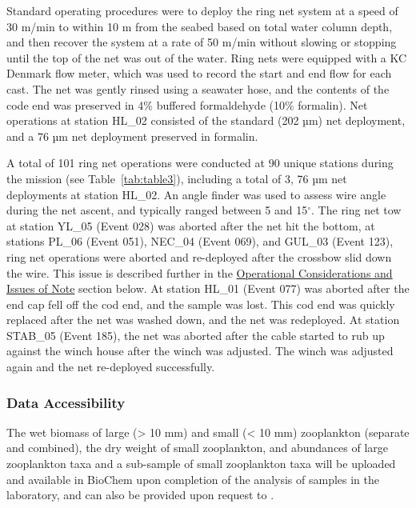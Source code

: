 \documentclass[12pt]{article}\usepackage[]{graphicx}\usepackage[]{color}
\begin{document}
Standard operating procedures were to deploy the ring net system at a speed of 30 m/min to within 10 m from the seabed based on total water column depth, and then recover the system at a rate of 50 m/min without slowing or stopping until the top of the net was out of the water. Ring nets were equipped with a KC Denmark flow meter, which was used to record the start and end flow for each cast. The net was gently rinsed using a seawater hose, and the contents of the code end was preserved in 4\% buffered formaldehyde (10\% formalin). Net operations at station HL\_02 consisted of the standard (202 µm) net deployment, and a 76 µm net deployment preserved in formalin.

A total of 101 ring net operations were conducted at 90 unique stations during the mission (see Table~\ref{tab:table3}), including a total of 3, 76 µm net deployments at station HL\_02. An angle finder was used to assess wire angle during the net ascent, and typically ranged between 5 and 15\(^\circ\). The ring net tow at station YL\_05 (Event 028) was aborted after the net hit the bottom, at stations PL\_06 (Event 051), NEC\_04 (Event 069), and GUL\_03 (Event 123), ring net operations were aborted and re-deployed after the crossbow slid down the wire. This issue is described further in the \hyperref[operation-issues]{Operational Considerations and Issues of Note} section below. At station HL\_01 (Event 077) was aborted after the end cap fell off the cod end, and the sample was lost. This cod end was quickly replaced after the net was washed down, and the net was redeployed. At station STAB\_05 (Event 185), the net was aborted after the cable started to rub up against the winch house after the winch was adjusted. The winch was adjusted again and the net re-deployed successfully.

\subsubsection{Data Accessibility}\label{data-accessibility-1}

The wet biomass of large (\textgreater{} 10 mm) and small (\textless{} 10 mm) zooplankton (separate and combined), the dry weight of small zooplankton, and abundances of large zooplankton taxa and a sub-sample of small zooplankton taxa will be uploaded and available in BioChem upon completion of the analysis of samples in the laboratory, and can also be provided upon request to .
\end{document}
